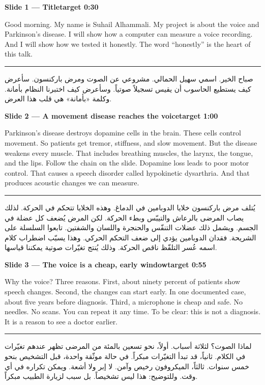 \documentclass[12pt,a4paper]{article}
\newcommand{\slidehead}[2]{%
\noindent\colorbox{honest!10}{\parbox{\dimexpr\textwidth-2\fboxsep}{%
\textbf{#1}\hfill\textbf{#2}}}\par\vspace{4pt}}
\newcommand{\arstart}{\par\vspace{6pt}\hrule\vspace{6pt}}
\begin{document}
\slidehead{Slide 1 --- Title}{target 0:30}
Good morning. My name is Suhail Alhammali.
My project is about the voice and Parkinson's disease.
I will show how a computer can measure a voice recording.
And I will show how we tested it honestly.
The word ``honestly'' is the heart of this talk.
\arstart
\begin{Arabic}
صباح الخير. اسمي سهيل الحمالي.
مشروعي عن الصوت ومرض باركنسون.
سأعرض كيف يستطيع الحاسوب أن يقيس تسجيلاً صوتياً.
وسأعرض كيف اختبرنا النظام بأمانة.
وكلمة «بأمانة» هي قلب هذا العرض.
\end{Arabic}
\clearpage

\slidehead{Slide 2 --- A movement disease reaches the voice}{target 1:00}
Parkinson's disease destroys dopamine cells in the brain.
These cells control movement.
So patients get tremor, stiffness, and slow movement.
But the disease weakens every muscle.
That includes breathing muscles, the larynx, the tongue, and the lips.
Follow the chain on the slide.
Dopamine loss leads to poor motor control.
That causes a speech disorder called hypokinetic dysarthria.
And that produces acoustic changes we can measure.
\arstart
\begin{Arabic}
يُتلف مرض باركنسون خلايا الدوبامين في الدماغ.
وهذه الخلايا تتحكم في الحركة.
لذلك يصاب المرضى بالرعاش والتيبّس وبطء الحركة.
لكن المرض يُضعف كل عضلة في الجسم.
ويشمل ذلك عضلات التنفّس والحنجرة واللسان والشفتين.
تابعوا السلسلة على الشريحة.
فقدان الدوبامين يؤدي إلى ضعف التحكم الحركي.
وهذا يسبّب اضطراب كلام اسمه عُسر التلفّظ ناقص الحركة.
وذلك يُنتج تغيّرات صوتية يمكننا قياسها.
\end{Arabic}
\clearpage

\slidehead{Slide 3 --- The voice is a cheap, early window}{target 0:55}
Why the voice? Three reasons.
First, about ninety percent of patients show speech changes.
Second, the changes can start early.
In one documented case, about five years before diagnosis.
Third, a microphone is cheap and safe.
No needles. No scans. You can repeat it any time.
To be clear: this is not a diagnosis.
It is a reason to see a doctor earlier.
\arstart
\begin{Arabic}
لماذا الصوت؟ لثلاثة أسباب.
أولاً، نحو تسعين بالمئة من المرضى تظهر عندهم تغيّرات في الكلام.
ثانياً، قد تبدأ التغيّرات مبكراً.
في حالة موثّقة واحدة، قبل التشخيص بنحو خمس سنوات.
ثالثاً، الميكروفون رخيص وآمن.
لا إبر ولا أشعة. ويمكن تكراره في أي وقت.
وللتوضيح: هذا ليس تشخيصاً.
بل سبب لزيارة الطبيب مبكراً.
\end{Arabic}
\clearpage
\end{document}
